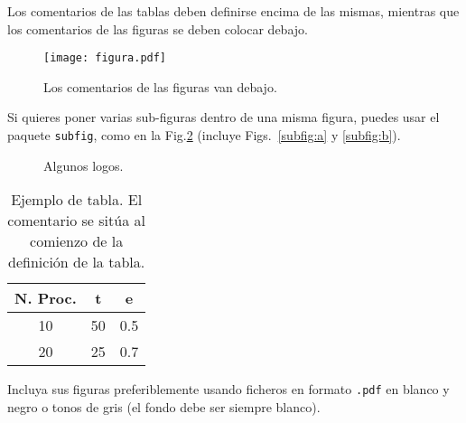 Los comentarios de las tablas deben definirse encima de las mismas, mientras que
los comentarios de las figuras se deben colocar debajo.

\begin{figure}[htb] 
\begin{center} 
  \texttt{[image: figura.pdf]}
\end{center} 
\caption{Los comentarios de las figuras van debajo.} 
\label{fig:curva} 
\end{figure} 

Si quieres poner varias sub-figuras dentro de una misma figura, puedes usar el
paquete \verb+subfig+, como en la Fig.\ref{fig:subfig} (incluye Figs.~\ref{subfig:a} y \ref{subfig:b}).

\begin{figure}[ht]
    \centering
    \hfill
    \caption{Algunos logos.}
    \label{fig:subfig}
    \end{figure}

\begin{table}[htb]
\caption{Ejemplo de tabla. El comentario se sitúa al comienzo de la
definición de la tabla.}
\begin{center}
{\footnotesize
\begin{tabular}{|c||c|c|}\hline
N. Proc. & t  & e   \\\hline\hline
10       & 50 & 0.5 \\\hline
20       & 25 & 0.7 \\\hline
\end{tabular}
}
\end{center}
\end{table}

Incluya sus figuras preferiblemente usando ficheros en formato {\tt .pdf} en
blanco y negro o tonos de gris (el fondo debe ser siempre blanco). 

